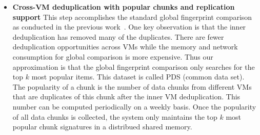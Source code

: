 \begin{itemize}
%

%

\item \textbf{Cross-VM deduplication with popular chunks and replication support}
This step accomplishes the standard global fingerprint  comparison as conducted
in the previous work~\cite{??}.
One key observation is that the inner deduplication has removed many of the duplicates.
There are fewer deduplication opportunities across VMs while the memory and network
consumption for global comparison is more expensive.
Thus our approximation is that the global fingerprint comparison only searches for the top $k$
most popular items. This dataset is called PDS (common data set). 
The popularity of a chunk is the number  of data chunks  from different VMs
that are duplicates of this chunk after the inner VM deduplication.
This number can be computed periodically on a weekly basis.
Once the popularity of all data chunks is collected, the system only maintains the top $k$
most popular chunk signatures in a distribued shared memory.  


\end{itemize}
